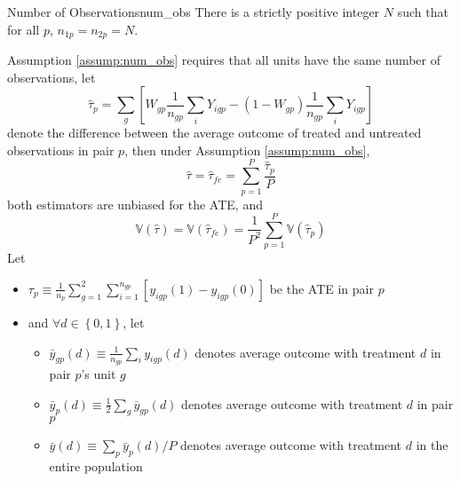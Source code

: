 \documentclass[twoside]{article}
\begin{document}
\begin{assumption}{Number of Observations}{num_obs}
    There is a strictly positive integer $N$ such that for all $p$, $n_{1p}=n_{2p}=N$.
\end{assumption}
Assumption \ref{assump:num_obs} requires that all units have the same number of observations, let 
\begin{equation*}
    \hat{\tau}_p = \sum_g \left[W_{gp} \frac{1}{n_{gp}} \sum_i Y_{igp} - \left(1-W_{gp}\right) \frac{1}{n_{gp}} \sum_i Y_{igp} \right]
\end{equation*}
denote the difference between the average outcome of treated and untreated observations in pair $p$, then under Assumption \ref{assump:num_obs}, 
\begin{equation*}
    \hat{\tau} = \hat{\tau}_{fe} = \sum^P_{p=1}\frac{\hat{\tau}_p}{P}
\end{equation*}
both estimators are unbiased for the ATE, and 
\begin{equation*}
    \mathbb{V}\left(\hat{\tau}\right) = \mathbb{V}\left(\hat{\tau}_{fe}\right) = \frac{1}{P^2}\sum^P_{p=1}\mathbb{V}\left(\hat{\tau}_p\right)
\end{equation*}
Let 
\begin{itemize}
    \item $\tau_p \equiv \frac{1}{n_p}\sum^2_{g=1}\sum^{n_{gp}}_{i=1}\left[y_{igp}(1)-y_{igp}(0)\right]$ be the ATE in pair $p$
    \item and $\forall d\in\left\{0,1\right\}$, let
    \begin{itemize}
        \item $\bar{y}_{gp}(d)\equiv \frac{1}{n_{gp}}\sum_i y_{igp}(d)$ denotes average outcome with treatment $d$ in pair $p$'s unit $g$
        \item $\bar{y}_p(d)\equiv \frac{1}{2}\sum_g \bar{y}_{gp}(d)$ denotes average outcome with treatment $d$ in pair $p$
        \item $\bar{y}(d)\equiv \sum_p\bar{y}_p(d)/P$ denotes average outcome with treatment $d$ in the entire population
    \end{itemize}
\end{itemize}
\end{document}
